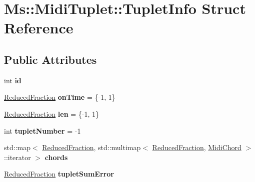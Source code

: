 \hypertarget{struct_ms_1_1_midi_tuplet_1_1_tuplet_info}{}\section{Ms\+:\+:Midi\+Tuplet\+:\+:Tuplet\+Info Struct Reference}
\label{struct_ms_1_1_midi_tuplet_1_1_tuplet_info}
\subsection*{Public Attributes}
\begin{DoxyCompactItemize}
\item 
\mbox{\label{struct_ms_1_1_midi_tuplet_1_1_tuplet_info_aea503a2100603d09173e390fb331b92f}} 
int {\bfseries id}
\item 
\mbox{\label{struct_ms_1_1_midi_tuplet_1_1_tuplet_info_a0e730e5fb9084ae5e566f5a0cf70e2db}} 
\hyperlink{class_ms_1_1_reduced_fraction}{Reduced\+Fraction} {\bfseries on\+Time} = \{-\/1, 1\}
\item 
\mbox{\label{struct_ms_1_1_midi_tuplet_1_1_tuplet_info_a23ae8c0769b8334859e35bb5edccc5a4}} 
\hyperlink{class_ms_1_1_reduced_fraction}{Reduced\+Fraction} {\bfseries len} = \{-\/1, 1\}
\item 
\mbox{\label{struct_ms_1_1_midi_tuplet_1_1_tuplet_info_a84aed462c81e246aea1a4fef6e481b73}} 
int {\bfseries tuplet\+Number} = -\/1
\item 
\mbox{\label{struct_ms_1_1_midi_tuplet_1_1_tuplet_info_ad94c5dda7946e683ed1295216e6d00a7}} 
std\+::map$<$ \hyperlink{class_ms_1_1_reduced_fraction}{Reduced\+Fraction}, std\+::multimap$<$ \hyperlink{class_ms_1_1_reduced_fraction}{Reduced\+Fraction}, \hyperlink{class_ms_1_1_midi_chord}{Midi\+Chord} $>$\+::iterator $>$ {\bfseries chords}
\item 
\mbox{\label{struct_ms_1_1_midi_tuplet_1_1_tuplet_info_a7f139ab67d8173e64156435b2570f347}} 
\hyperlink{class_ms_1_1_reduced_fraction}{Reduced\+Fraction} {\bfseries tuplet\+Sum\+Error}

\end{DoxyCompactItemize}
